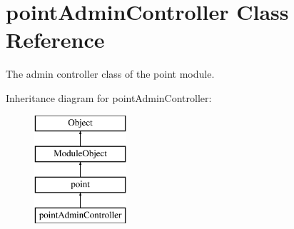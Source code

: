 \hypertarget{classpointAdminController}{\section{point\+Admin\+Controller Class Reference}
\label{classpointAdminController}
}


The admin controller class of the point module.  


Inheritance diagram for point\+Admin\+Controller\+:\begin{figure}[H]
\begin{center}
\leavevmode
\includegraphics[height=4.000000cm]{classpointAdminController}
\end{center}
\end{figure}
